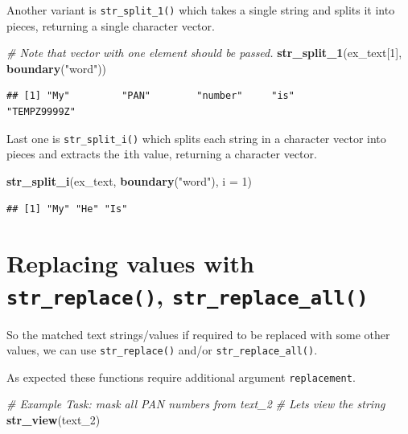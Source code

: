 \documentclass[
]{book}
\newenvironment{Shaded}{\begin{snugshade}}{\end{snugshade}}
\newcommand{\AttributeTok}[1]{\textcolor[rgb]{0.13,0.29,0.53}{#1}}
\newcommand{\CommentTok}[1]{\textcolor[rgb]{0.56,0.35,0.01}{\textit{#1}}}
\newcommand{\DecValTok}[1]{\textcolor[rgb]{0.00,0.00,0.81}{#1}}
\newcommand{\FunctionTok}[1]{\textcolor[rgb]{0.13,0.29,0.53}{\textbf{#1}}}
\newcommand{\NormalTok}[1]{#1}
\newcommand{\StringTok}[1]{\textcolor[rgb]{0.31,0.60,0.02}{#1}}
\begin{document}
Another variant is \texttt{str\_split\_1()} which takes a single string and splits it into pieces, returning a single character vector.

\begin{Shaded}
\begin{Highlighting}[]
\CommentTok{\# Note that vector with one element should be passed.}
\FunctionTok{str\_split\_1}\NormalTok{(ex\_text[}\DecValTok{1}\NormalTok{], }\FunctionTok{boundary}\NormalTok{(}\StringTok{"word"}\NormalTok{))}
\end{Highlighting}
\end{Shaded}

\begin{verbatim}
## [1] "My"         "PAN"        "number"     "is"         "TEMPZ9999Z"
\end{verbatim}

Last one is \texttt{str\_split\_i()} which splits each string in a character vector into pieces and extracts the \texttt{i}th value, returning a character vector.

\begin{Shaded}
\begin{Highlighting}[]
\FunctionTok{str\_split\_i}\NormalTok{(ex\_text, }\FunctionTok{boundary}\NormalTok{(}\StringTok{"word"}\NormalTok{), }\AttributeTok{i =} \DecValTok{1}\NormalTok{)}
\end{Highlighting}
\end{Shaded}

\begin{verbatim}
## [1] "My" "He" "Is"
\end{verbatim}

\hypertarget{replacing-values-with-str_replace-str_replace_all}{%
\section{\texorpdfstring{Replacing values with \texttt{str\_replace()}, \texttt{str\_replace\_all()}}{Replacing values with str\_replace(), str\_replace\_all()}}\label{replacing-values-with-str_replace-str_replace_all}}

So the matched text strings/values if required to be replaced with some other values, we can use \texttt{str\_replace()} and/or \texttt{str\_replace\_all()}.

As expected these functions require additional argument \texttt{replacement}.

\begin{Shaded}
\begin{Highlighting}[]
\CommentTok{\# Example Task: mask all PAN numbers from \textasciigrave{}text\_2\textasciigrave{}}
\CommentTok{\# Let\textquotesingle{}s view the string}
\FunctionTok{str\_view}\NormalTok{(text\_2)}
\end{Highlighting}
\end{Shaded}
\end{document}
